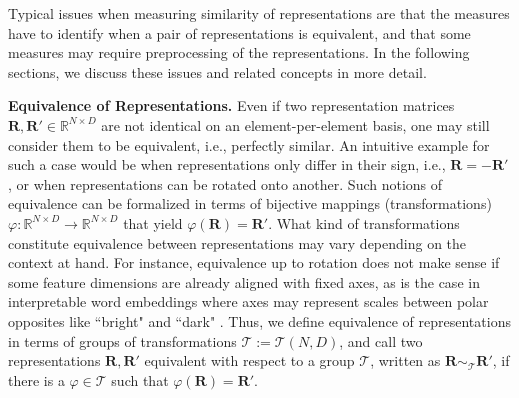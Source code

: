 \documentclass{article}
\newcommand{\Real}{\mathbb{R}}
\newcommand{\R}{\bm{R}}
\newcommand{\Rp}{\bm{R'}}
\newcommand{\subheader}{\textbf}
\begin{document}
Typical issues when measuring similarity of representations are that the measures have to identify when a pair of representations is equivalent, and that some measures may require preprocessing of the representations.
In the following sections, we discuss these issues and related concepts in more detail.

\subheader{Equivalence of Representations.}
Even if two representation matrices $\R, \Rp\in\Real^{N\times D}$ are not identical on an element-per-element basis, one may still consider them to be equivalent, i.e., perfectly similar.
An intuitive example for such a case would be when representations only differ in their sign, i.e., $\R= -\Rp$, or when representations can be rotated onto another.
Such notions of equivalence can be formalized in terms of bijective mappings (transformations) $\varphi:\Real^{N \times D}\longrightarrow \Real^{N \times D}$ that yield $\varphi(\R) = \Rp$.
What kind of transformations constitute equivalence between representations may vary depending on the context at hand.
For instance, equivalence up to rotation does not make sense if some feature dimensions are already aligned with fixed axes, as is the case in interpretable word embeddings where axes may represent scales between polar opposites like ``bright" and ``dark" \cite{mathew_polar_2020}.
Thus, we define equivalence of representations in terms of groups of transformations $\mathcal{T}:=\mathcal{T}(N,D)$, and call two representations $\R, \Rp$ equivalent with respect to a group $\mathcal{T}$, written as $\R \sim_\mathcal{T} \Rp$, if there is a $\varphi\in\mathcal{T}$ such that $\varphi(\R) = \Rp$.
\end{document}
